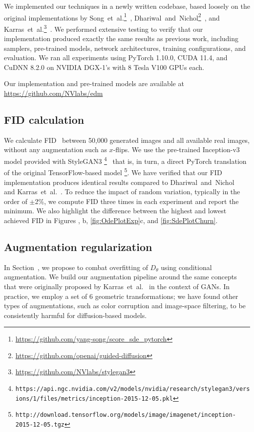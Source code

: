 We implemented our techniques in a newly written codebase, based loosely on the original implementations by
Song~et~al.\footnote{\small\url{https://github.com/yang-song/score\_sde\_pytorch}}~\cite{Song2021sde},
Dhariwal~and~Nichol\footnote{\small\url{https://github.com/openai/guided-diffusion}}~\cite{Dhariwal2021},
and Karras~et~al.\footnote{\small\url{https://github.com/NVlabs/stylegan3}}~\cite{Karras2021alias}.
We performed extensive testing to verify that our implementation produced exactly the same results as previous work, including samplers, pre-trained models, network architectures, training configurations, and evaluation.
We ran all experiments using PyTorch 1.10.0, CUDA 11.4, and CuDNN 8.2.0 on NVIDIA DGX-1's with 8 Tesla V100 GPUs each.

{Our implementation and pre-trained models are available at \url{https://github.com/NVlabs/edm}}

\subsection{FID calculation}
\label{app:fid}

We calculate FID~\cite{Heusel2017} between 50,000 generated images and all available real images, without any augmentation such as $x$-flips.
We use the pre-trained Inception-v3 model provided with StyleGAN3%
\footnote{\tiny\texttt{https://api.ngc.nvidia.com/v2/models/nvidia/research/stylegan3/versions/1/files/metrics/inception-2015-12-05.pkl}}~\cite{Karras2021alias}
that is, in turn, a direct PyTorch translation of the original TensorFlow-based model%
\footnote{\tiny\texttt{http://download.tensorflow.org/models/image/imagenet/inception-2015-12-05.tgz}}.
We have verified that our FID implementation produces identical results compared to Dhariwal~and~Nichol~\cite{Dhariwal2021} and Karras~et~al.~\cite{Karras2021alias}.
To reduce the impact of random variation, typically in the order of $\pm$2\%, we compute FID three times in each experiment and report the minimum.
We also highlight the difference between the highest and lowest achieved FID in Figures , b, \ref{fig:OdePlotExp}c, and \ref{fig:SdePlotChurn}.

\subsection{Augmentation regularization}
\label{app:augmentdetails}

In Section~, we propose to combat overfitting of $D_\theta$ using conditional augmentation.
We build our augmentation pipeline around the same concepts that were originally proposed by Karras~et~al.~\cite{Karras2020ada} in the context of GANs.
In practice, we employ a set of 6 geometric transformations; we have found other types of augmentations, such as color corruption and image-space filtering, to be consistently harmful for diffusion-based models.

